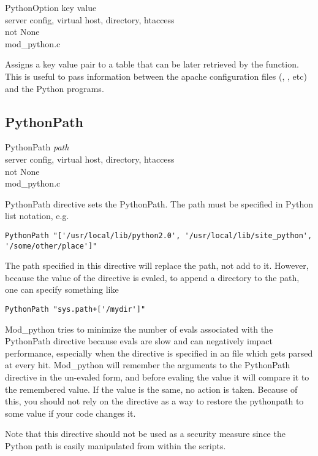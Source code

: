 PythonOption key value \\
server config, virtual host, directory, htaccess\\
not None\\
mod_python.c

Assigns a key value pair to a table that can be later retrieved by the
 function. This is useful to pass information
between the apache configuration files (,
, etc) and the Python programs.

\subsection{PythonPath\label{dir-other-pp}}

PythonPath \emph{path} \\
server config, virtual host, directory, htaccess\\
not None\\
mod_python.c

PythonPath directive sets the PythonPath. The path must be specified
in Python list notation, e.g.

\begin{verbatim}
PythonPath "['/usr/local/lib/python2.0', '/usr/local/lib/site_python', '/some/other/place']"
\end{verbatim}

The path specified in this directive will replace the path, not add to
it. However, because the value of the directive is evaled, to append a
directory to the path, one can specify something like

\begin{verbatim}
PythonPath "sys.path+['/mydir']"
\end{verbatim}

Mod_python tries to minimize the number of evals associated with the
PythonPath directive because evals are slow and can negatively impact
performance, especially when the directive is specified in an
 file which gets parsed at every hit. Mod_python will
remember the arguments to the PythonPath directive in the un-evaled
form, and before evaling the value it will compare it to the
remembered value. If the value is the same, no action is
taken. Because of this, you should not rely on the directive as a way
to restore the pythonpath to some value if your code changes it.

Note that this directive should not be used as a security measure
since the Python path is easily manipulated from within the scripts.

